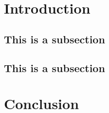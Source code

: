\documentclass{article}
\title{}
\author{Aakash Pahuja}
\date{} %
\begin{document}
\maketitle

\section{Introduction}


\subsection{This is a subsection}

\subsection{This is a subsection}

\section{Conclusion}
\end{document}
